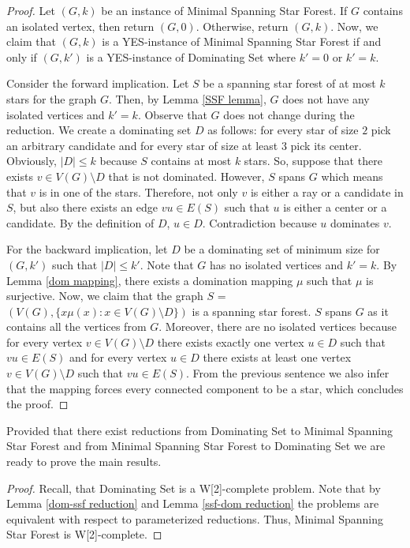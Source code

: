 \documentclass[en]{pracamgr}
\theoremstyle{definition}
\newcommand{\mssfp}{{\sc Minimal Spanning Star Forest}}
\newcommand{\domsetp}{{\sc Dominating Set}}
\begin{document}
\begin{proof}
	Let $(G,k)$ be an instance of \mssfp{}. If $G$ contains an isolated vertex, then return $(G,0)$. Otherwise, return $(G,k)$. Now, we claim that $(G,k)$ is a YES-instance of \mssfp{} if and only if $(G,k')$ is a YES-instance of \domsetp{} where $k'=0$ or $k'=k$.
	
	Consider the forward implication. Let $S$ be a spanning star forest of at most $k$ stars for the graph $G$. Then, by Lemma \ref{SSF lemma}, $G$ does not have any isolated vertices and $k'=k$. Observe that $G$ does not change during the reduction. We create a dominating set $D$ as follows: for every star of size $2$ pick an arbitrary candidate and for every star of size at least $3$ pick its center. Obviously, $|D| \leq k$ because $S$ contains at most $k$ stars. So, suppose that there exists $v \in V(G) \setminus D$ that is not dominated. However, $S$ spans $G$ which means that $v$ is in one of the stars. Therefore, not only $v$ is either a ray or a candidate in $S$, but also there exists an edge $vu \in E(S)$ such that $u$ is either a center or a candidate. By the definition of $D$, $u \in D$. Contradiction because $u$ dominates $v$.
	
	For the backward implication, let $D$ be a dominating set of minimum size for $(G,k')$ such that $|D| \leq k'$. Note that $G$ has no isolated vertices and $k'=k$. By Lemma \ref{dom mapping}, there exists a domination mapping $\mu$ such that $\mu$ is surjective. Now, we claim that the graph $S$ = $(V(G), \{x\mu(x): x \in V(G) \setminus D\})$ is a spanning star forest. $S$ spans $G$ as it contains all the vertices from $G$. Moreover, there are no isolated vertices because for every vertex $v \in V(G) \setminus D$ there exists exactly one vertex $u \in D$ such that $vu \in E(S)$ and for every vertex $u \in D$ there exists at least one vertex $v \in V(G) \setminus D$ such that $vu \in E(S)$. From the previous sentence we also infer that the mapping forces every connected component to be a star, which concludes the proof.
\end{proof}

Provided that there exist reductions from \domsetp{} to \mssfp{} and from \mssfp{} to \domsetp{} we are ready to prove the main results.

\thmmssfpwc*

\begin{proof}
	Recall, that \domsetp{} is a W[2]-complete problem. Note that by Lemma \ref{dom-ssf reduction} and Lemma \ref{ssf-dom reduction} the problems are equivalent with respect to parameterized reductions. Thus, \mssfp{} is W[2]-complete.
\end{proof}
\end{document}
